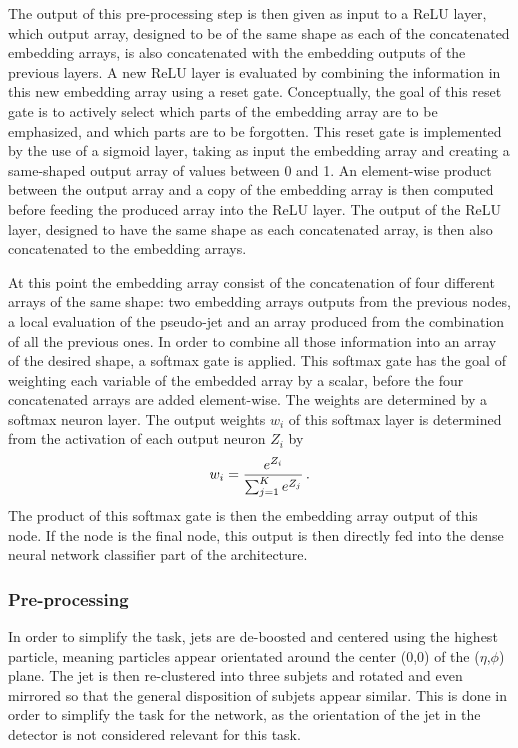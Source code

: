 The output of this pre-processing step is then given as input to a ReLU layer, which output array, designed to be of the same shape as each of the concatenated embedding arrays, is also concatenated with the embedding outputs of the previous layers. A new ReLU layer is evaluated by combining the information in this new embedding array using a reset gate. Conceptually, the goal of this reset gate is to actively select which parts of the embedding array are to be emphasized, and which parts are to be forgotten. This reset gate is implemented by the use of a sigmoid layer, taking as input the embedding array and creating a same-shaped output array of values between 0 and 1. An element-wise product between the output array and a copy of the embedding array is then computed before feeding the produced array into the ReLU layer. The output of the ReLU layer, designed to have the same shape as each concatenated array, is then also concatenated to the embedding arrays.

At this point the embedding array consist of the concatenation of four different arrays of the same shape: two embedding arrays outputs from the previous nodes, a local evaluation of the pseudo-jet and an array produced from the combination of all the previous ones. In order to combine all those information into an array of the desired shape, a softmax gate is applied. This softmax gate has the goal of weighting each variable of the embedded array by a scalar, before the four concatenated arrays are added element-wise. The weights are determined by a softmax neuron layer. The output weights $w_i$ of this softmax layer is determined from the activation of each output neuron $Z_i$ by
\begin{equation}
    w_{i} = \frac{e^{Z_i}}{\sum_{j=1}^{K}e^{Z_j}} \mend
\end{equation}
The product of this softmax gate is then the embedding array output of this node. If the node is the final node, this output is then directly fed into the dense neural network classifier part of the architecture.

\subsubsection{Pre-processing}

In order to simplify the task, jets are de-boosted and centered using the highest \pt particle, meaning particles appear orientated around the center (0,0) of the ($\eta$,$\phi$) plane. The jet is then re-clustered into three subjets and rotated and even mirrored so that the general disposition of subjets appear similar. This is done in order to simplify the task for the network, as the orientation of the jet in the detector is not considered relevant for this task.

